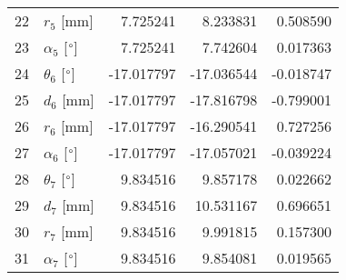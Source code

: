 \documentclass{standalone}%
\begin{document}
\begin{tabular}{llrrr}
22 &              $r_{5}$ [mm] &   7.725241 &   8.233831 &   0.508590 \\
23 &  $\alpha_{5}$ [$\degree$] &   7.725241 &   7.742604 &   0.017363 \\
24 &  $\theta_{6}$ [$\degree$] & -17.017797 & -17.036544 &  -0.018747 \\
25 &              $d_{6}$ [mm] & -17.017797 & -17.816798 &  -0.799001 \\
26 &              $r_{6}$ [mm] & -17.017797 & -16.290541 &   0.727256 \\
27 &  $\alpha_{6}$ [$\degree$] & -17.017797 & -17.057021 &  -0.039224 \\
28 &  $\theta_{7}$ [$\degree$] &   9.834516 &   9.857178 &   0.022662 \\
29 &              $d_{7}$ [mm] &   9.834516 &  10.531167 &   0.696651 \\
30 &              $r_{7}$ [mm] &   9.834516 &   9.991815 &   0.157300 \\
31 &  $\alpha_{7}$ [$\degree$] &   9.834516 &   9.854081 &   0.019565 \\
\bottomrule
\end{tabular}
%
\end{document}
